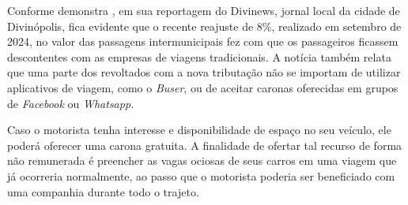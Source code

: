Conforme demonstra , em sua reportagem do Divinews, jornal local da cidade de Divinópolis, fica evidente que o recente reajuste de 8\%, realizado em setembro de 2024, no valor das passagens intermunicipais fez com que os passageiros ficassem descontentes  com as empresas de viagens tradicionais. A notícia também relata que uma parte dos revoltados com a nova tributação não se importam de utilizar aplicativos de viagem, como o \textit{Buser}, ou de aceitar caronas oferecidas em grupos de \textit{Facebook} ou \textit{Whatsapp.}

Caso o motorista tenha interesse e disponibilidade de espaço no seu veículo, ele poderá oferecer uma carona gratuita. A finalidade de ofertar tal recurso de forma não remunerada é preencher as vagas ociosas de seus carros em uma viagem que já ocorreria normalmente, ao passo que o motorista poderia ser beneficiado com uma companhia durante todo o trajeto.
